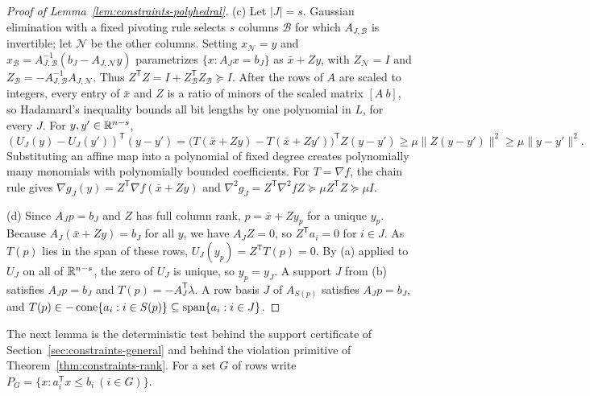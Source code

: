 \begin{proof}[Proof of Lemma~\ref{lem:constraints-polyhedral}]
(c) Let $|J|=s$. Gaussian elimination with a fixed pivoting rule selects $s$
columns $\mathcal B$ for which $A_{J,\mathcal B}$ is invertible; let
$\mathcal N$ be the other columns. Setting $x_{\mathcal N}=y$ and
$x_{\mathcal B}=A_{J,\mathcal B}^{-1}(b_J-A_{J,\mathcal N}y)$ parametrizes
$\{x:A_Jx=b_J\}$ as $\bar x+Zy$, with $Z_{\mathcal N}=I$ and
$Z_{\mathcal B}=-A_{J,\mathcal B}^{-1}A_{J,\mathcal N}$. Thus
$Z^{\mathsf T}Z=I+Z_{\mathcal B}^{\mathsf T}Z_{\mathcal B}\succeq I$. After the
rows of $A$ are scaled to integers, every entry of $\bar x$ and $Z$ is a ratio
of minors of the scaled matrix $[A\ b]$, so Hadamard's inequality bounds all
bit lengths by one polynomial in $L$, for every $J$. For $y,y'\in\mathbb R^{n-s}$,
\[
 (U_J(y)-U_J(y'))^{\mathsf T}(y-y')
 =\bigl(T(\bar x+Zy)-T(\bar x+Zy')\bigr)^{\mathsf T}Z(y-y')
 \ge\mu\|Z(y-y')\|^2\ge\mu\|y-y'\|^2 .
\]
Substituting an affine map into a polynomial of fixed degree creates
polynomially many monomials with polynomially bounded coefficients. For
$T=\nabla f$, the chain rule gives $\nabla g_J(y)=Z^{\mathsf T}\nabla f(\bar x+Zy)$
and $\nabla^2g_J=Z^{\mathsf T}\nabla^2fZ\succeq\mu Z^{\mathsf T}Z\succeq\mu I$.

(d) Since $A_Jp=b_J$ and $Z$ has full column rank, $p=\bar x+Zy_p$ for a
unique $y_p$. Because $A_J(\bar x+Zy)=b_J$ for all $y$, we have $A_JZ=0$, so
$Z^{\mathsf T}a_i=0$ for $i\in J$. As $T(p)$ lies in the span of these rows,
$U_J(y_p)=Z^{\mathsf T}T(p)=0$. By (a) applied to $U_J$ on all of
$\mathbb R^{n-s}$, the zero of $U_J$ is unique, so $y_p=y_J$. A support $J$ from (b)
satisfies $A_Jp=b_J$ and $T(p)=-A_J^{\mathsf T}\lambda$. A row basis $J$ of
$A_{S(p)}$ satisfies $A_Jp=b_J$, and
$T(p)\in-\operatorname{cone}\{a_i:i\in S(p)\}\subseteq\operatorname{span}\{a_i:i\in J\}$.
\end{proof}

The next lemma is the deterministic test behind the support certificate of
Section~\ref{sec:constraints-general} and behind the violation primitive of
Theorem~\ref{thm:constraints-rank}. For a set $G$ of rows write
$P_G=\{x:a_i^{\mathsf T}x\le b_i\ (i\in G)\}$.

